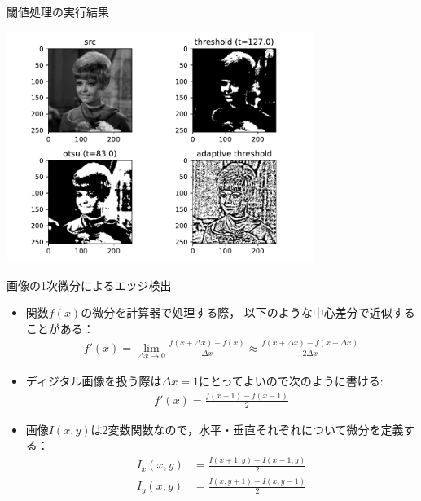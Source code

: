 \documentclass[10pt]{beamer}
\begin{document}
	\begin{frame}{閾値処理の実行結果}
	    \begin{center}
			\includegraphics[width=10cm]{./figs/threshold.pdf}
		\end{center}
	\end{frame}
	
	\begin{frame}{画像の1次微分によるエッジ検出}
	    \begin{itemize}
	        \item 関数$f(x)$の微分を計算器で処理する際，
	            以下のような中心差分で近似することがある：
        	    \begin{align*}
        	        f'(x) = \lim_{\Delta x\to0}\frac{f(x+\Delta x)-f(x)}{\Delta x}
        	        \approx
        	        \frac{f(x+\Delta x)-f(x-\Delta x)}{2\Delta x}
        	    \end{align*}
        	\item ディジタル画像を扱う際は$\Delta x = 1$にとってよいので次のように書ける:
        	    \begin{align*}
        	        f'(x) = \frac{f(x+1)-f(x-1)}{2}
        	    \end{align*}
        	\item 画像$I(x, y)$は2変数関数なので，水平・垂直それぞれについて微分を定義する：
        	    \begin{align*}
        	        I_x(x, y) &= \frac{I(x+1, y)-I(x-1, y)}{2} \\
        	        I_y(x, y) &= \frac{I(x, y+1)-I(x, y-1)}{2} 
        	    \end{align*}
	    \end{itemize}
	\end{frame}
	
\end{document}
